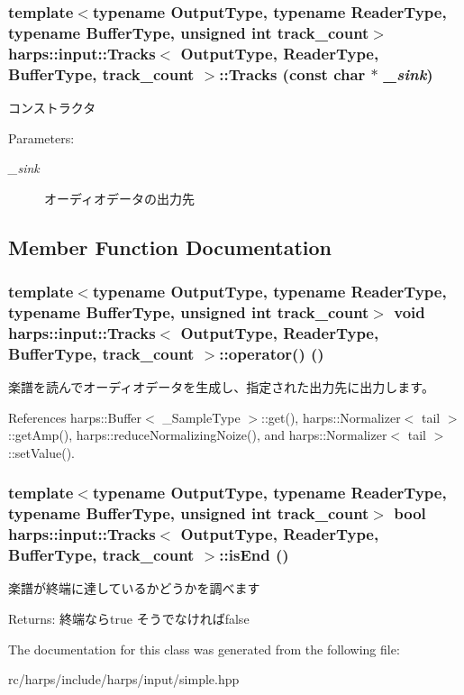 \subsubsection[Tracks]{\setlength{\rightskip}{0pt plus 5cm}template$<$typename OutputType, typename ReaderType, typename BufferType, unsigned int track\_\-count$>$ {\bf harps::input::Tracks}$<$ OutputType, ReaderType, BufferType, track\_\-count $>$::{\bf Tracks} (const char $\ast$ {\em \_\-sink})\hspace{0.3cm}{\tt  [inline]}}\label{classharps_1_1input_1_1Tracks_9f4150bcd3a5ac116d4759909ea9a9cd}


コンストラクタ \begin{Desc}
\item[Parameters:]
\begin{description}
\item[{\em \_\-sink}]オーディオデータの出力先 \end{description}
\end{Desc}


\subsection{Member Function Documentation}
\subsubsection[operator()]{\setlength{\rightskip}{0pt plus 5cm}template$<$typename OutputType, typename ReaderType, typename BufferType, unsigned int track\_\-count$>$ void {\bf harps::input::Tracks}$<$ OutputType, ReaderType, BufferType, track\_\-count $>$::operator() ()\hspace{0.3cm}{\tt  [inline]}}\label{classharps_1_1input_1_1Tracks_39bfd26b91c4f04a0c6d9c7fdb01e1d9}


楽譜を読んでオーディオデータを生成し、指定された出力先に出力します。 

References harps::Buffer$<$ \_\-SampleType $>$::get(), harps::Normalizer$<$ tail $>$::getAmp(), harps::reduceNormalizingNoize(), and harps::Normalizer$<$ tail $>$::setValue().
\subsubsection[isEnd]{\setlength{\rightskip}{0pt plus 5cm}template$<$typename OutputType, typename ReaderType, typename BufferType, unsigned int track\_\-count$>$ bool {\bf harps::input::Tracks}$<$ OutputType, ReaderType, BufferType, track\_\-count $>$::isEnd ()\hspace{0.3cm}{\tt  [inline]}}\label{classharps_1_1input_1_1Tracks_acb1ba476857eeaa4baaaa3e04c549de}


楽譜が終端に達しているかどうかを調べます \begin{Desc}
\item[Returns:]終端ならtrue そうでなければfalse \end{Desc}


The documentation for this class was generated from the following file:\begin{CompactItemize}
\item 
rc/harps/include/harps/input/simple.hpp\end{CompactItemize}
